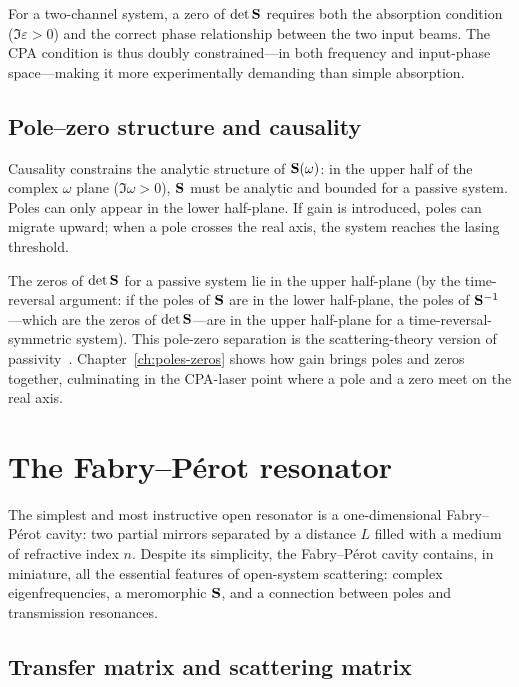 For a two-channel system, a zero of $\det\mathbf{S}$ requires both the
absorption condition ($\Im\varepsilon > 0$) and the correct phase
relationship between the two input beams. The CPA condition is thus
doubly constrained---in both frequency and input-phase space---making it
more experimentally demanding than simple absorption.

\subsection{Pole--zero structure and causality}
\label{ssec:pole-zero-causality}

Causality constrains the analytic structure of $\mathbf{S}(\omega)$: in the
upper half of the complex $\omega$ plane ($\Im\omega > 0$), $\mathbf{S}$ must
be analytic and bounded for a passive system. Poles can only appear in
the lower half-plane. If gain is introduced, poles can migrate upward;
when a pole crosses the real axis, the system reaches the lasing
threshold.

The zeros of $\det\mathbf{S}$ for a passive system lie in the upper
half-plane (by the time-reversal argument: if the poles of
$\mathbf{S}$ are in the lower half-plane, the poles of
$\mathbf{S}^{-1}$---which are the zeros of $\det\mathbf{S}$---are in the
upper half-plane for a time-reversal-symmetric system). This
pole-zero separation is the scattering-theory version of passivity~\cite{zhao2019connection}.
Chapter~\ref{ch:poles-zeros} shows how gain brings poles and zeros
together, culminating in the CPA-laser point where a pole and a zero
meet on the real axis.


\section{The Fabry--P\'erot resonator}
\label{sec:fabry-perot}

The simplest and most instructive open resonator is a one-dimensional
Fabry--P\'erot cavity: two partial mirrors separated by a distance $L$
filled with a medium of refractive index $n$. Despite its simplicity, the
Fabry--P\'erot cavity contains, in miniature, all the essential features of
open-system scattering: complex eigenfrequencies, a meromorphic $\mathbf{S}$,
and a connection between poles and transmission resonances.

\subsection{Transfer matrix and scattering matrix}
\label{ssec:fp-transfer}

